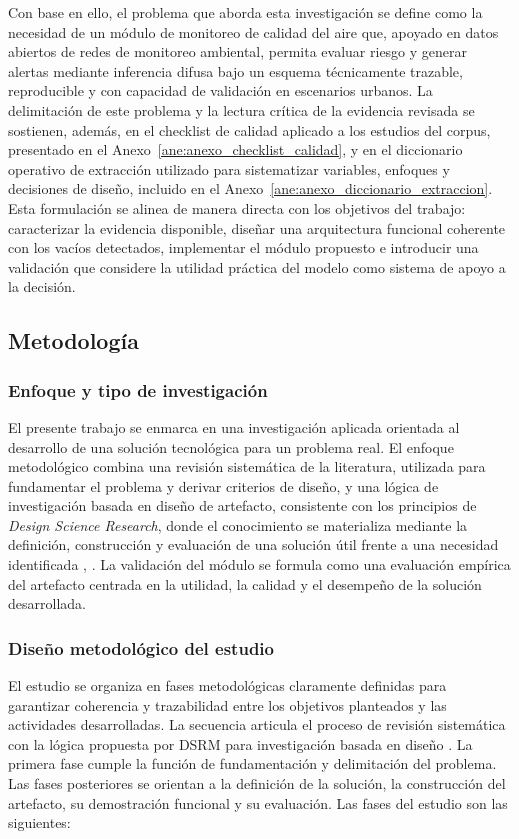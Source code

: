 Con base en ello, el problema que aborda esta investigación se define como la necesidad de un módulo de monitoreo de calidad del aire que, apoyado en datos abiertos de redes de monitoreo ambiental, permita evaluar riesgo y generar alertas mediante inferencia difusa bajo un esquema técnicamente trazable, reproducible y con capacidad de validación en escenarios urbanos. La delimitación de este problema y la lectura crítica de la evidencia revisada se sostienen, además, en el checklist de calidad aplicado a los estudios del corpus, presentado en el Anexo~\ref{ane:anexo_checklist_calidad}, y en el diccionario operativo de extracción utilizado para sistematizar variables, enfoques y decisiones de diseño, incluido en el Anexo~\ref{ane:anexo_diccionario_extraccion}. Esta formulación se alinea de manera directa con los objetivos del trabajo: caracterizar la evidencia disponible, diseñar una arquitectura funcional coherente con los vacíos detectados, implementar el módulo propuesto e introducir una validación que considere la utilidad práctica del modelo como sistema de apoyo a la decisión.


\subsection{Metodología}

\subsubsection{Enfoque y tipo de investigación}
El presente trabajo se enmarca en una investigación aplicada orientada al desarrollo de una solución tecnológica para un problema real. El enfoque metodológico combina una revisión sistemática de la literatura, utilizada para fundamentar el problema y derivar criterios de diseño, y una lógica de investigación basada en diseño de artefacto, consistente con los principios de \emph{Design Science Research}, donde el conocimiento se materializa mediante la definición, construcción y evaluación de una solución útil frente a una necesidad identificada \cite[pp.~75--77]{METDSR01}, \cite[pp.~46,55--56]{METDSRM01}. La validación del módulo se formula como una evaluación empírica del artefacto centrada en la utilidad, la calidad y el desempeño de la solución desarrollada.

\subsubsection{Diseño metodológico del estudio}
El estudio se organiza en fases metodológicas claramente definidas para garantizar coherencia y trazabilidad entre los objetivos planteados y las actividades desarrolladas. La secuencia articula el proceso de revisión sistemática con la lógica propuesta por DSRM para investigación basada en diseño \cite[pp.~46,71]{METDSRM01}. La primera fase cumple la función de fundamentación y delimitación del problema. Las fases posteriores se orientan a la definición de la solución, la construcción del artefacto, su demostración funcional y su evaluación. Las fases del estudio son las siguientes:

